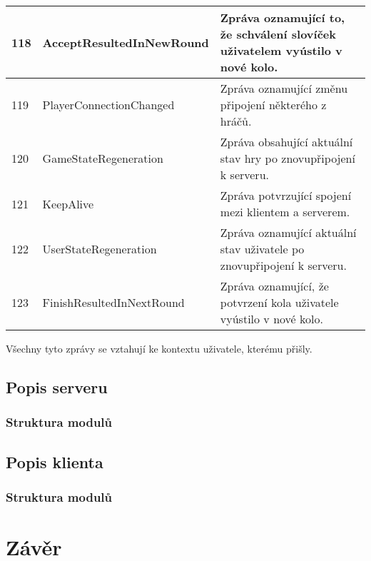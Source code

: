\documentclass[12pt, a4paper]{article}
\let\oldsection\section
\renewcommand\section{\clearpage\oldsection}
\begin{document}
\pagebreak

\begin{center}
		\begin{tabularx}{\textwidth}{|l|l|X|}
			\hline
			118          &AcceptResultedInNewRound&Zpráva oznamující to, že schválení slovíček uživatelem vyústilo v nové kolo.\\
			\hline
			119          &PlayerConnectionChanged  &Zpráva oznamující změnu připojení některého z hráčů.\\
			\hline
			120          &GameStateRegeneration              &Zpráva obsahující aktuální stav hry po znovupřipojení k serveru.\\
			\hline
			121          &KeepAlive  &Zpráva potvrzující spojení mezi klientem a serverem.\\
			\hline
			122          &UserStateRegeneration&Zpráva oznamující aktuální stav uživatele po znovupřipojení k serveru.\\
			\hline
			123          &FinishResultedInNextRound&Zpráva oznamující, že potvrzení kola uživatele vyústilo v nové kolo.\\
			\hline
		\end{tabularx}
\end{center}  
Všechny tyto zprávy se vztahují ke kontextu uživatele, kterému přišly.

	    \subsection{Popis serveru}
		    \subsubsection{Struktura modulů}

	    \subsection{Popis klienta}
   		    \subsubsection{Struktura modulů}
    
    \section{Závěr}
    



	
	
\end{document}
